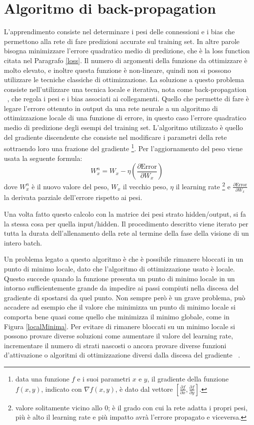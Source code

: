 \documentclass[12pt]{report}
\begin{document}
\section{Algoritmo di back-propagation}\label{backprop}
L'apprendimento consiste nel determinare i pesi delle connessioni e i bias che permettono alla rete di fare predizioni accurate sul training set. In altre parole bisogna minimizzare l'errore quadratico medio di predizione, che è la loss function citata nel Paragrafo \ref{loss}.
Il numero di argomenti della funzione da ottimizzare è molto elevato, e inoltre questa funzione è non-lineare, quindi non si possono utilizzare le tecniche classiche di ottimizzazione. La soluzione a questo problema consiste nell'utilizzare una tecnica locale e iterativa, nota come back-propagation ~\cite{Backpropagation}, che regola i pesi e i bias associati ai collegamenti. Quello che permette di fare è legare l'errore ottenuto in output da una rete neurale a un algoritmo di ottimizzazione locale di una funzione di errore, in questo caso l'errore quadratico medio di predizione degli esempi del training set. L'algoritmo utilizzato è quello del gradiente discendente che consiste nel modificare i parametri della rete sottraendo loro una frazione del gradiente \footnote{data una funzione $f$ e i suoi parametri $x$ e $y$, il gradiente della funzione $f(x, y)$, indicato con $\nabla f(x, y)$, è dato dal vettore $[\frac{\partial f}{\partial x}, \frac{\partial f}{\partial y}]$.}.
Per l'aggiornamento del peso viene usata la seguente formula:
$$W^n_x = W_x - \eta \left(\frac{\partial \mathrm{Error}}{\partial W_x}\right)$$ dove $W^n_x$ è il nuovo valore del peso, $W_x$ il vecchio peso, $\eta$ il learning rate \footnote{valore solitamente vicino allo 0; è il grado con cui la rete adatta i propri pesi, più è alto il learning rate e più impatto avrà l'errore propagato e viceversa.} e $\frac{\partial \mathrm{Error}}{\partial W_x}$ la derivata parziale dell'errore rispetto ai pesi. 

Una volta fatto questo calcolo con la matrice dei pesi strato hidden/output, si fa la stessa cosa per quella input/hidden. Il procedimento descritto viene iterato per tutta la durata dell'allenamento della rete al termine della fase della visione di un intero batch.

Un problema legato a questo algoritmo è che è possibile rimanere bloccati in un punto di minimo locale, dato che l'algoritmo di ottimizzazione usato è locale. Questo succede quando la funzione presenta un punto di minimo locale in un intorno sufficientemente grande da impedire ai passi compiuti nella discesa del gradiente di spostarsi da quel punto. Non sempre però è un grave problema, può accadere ad esempio che il valore che minimizza un punto di minimo locale si comporta bene quasi come quello che minimizza il minimo globale, come in Figura \ref{localMinima}. Per evitare di rimanere bloccati su un minimo locale si possono provare diverse soluzioni come aumentare il valore del learning rate, incrementare il numero di strati nascosti o ancora provare diverse funzioni d'attivazione o algoritmi di ottimizzazione diversi dalla discesa del gradiente ~\cite{LocalMinima}.
\end{document}
